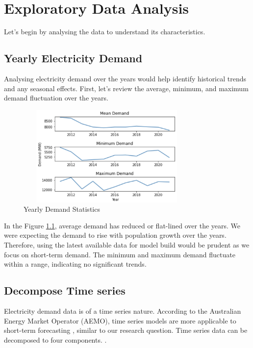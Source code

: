 \documentclass[mstat,12pt]{unswthesis}
\begin{document}
\hypertarget{exploratory-data-analysis}{%
\chapter{Exploratory Data Analysis}\label{exploratory-data-analysis}}

Let's begin by analysing the data to understand its characteristics.

\hypertarget{yearly-electricity-demand}{%
\section{Yearly Electricity Demand}\label{yearly-electricity-demand}}

Analysing electricity demand over the years would help identify
historical trends and any seasonal effects. First, let's review the
average, minimum, and maximum demand fluctuation over the years.

\begin{figure}[H]
\centering
\includegraphics[width=0.80\textwidth,height=5cm]{demand_stats.png}
\caption{Yearly Demand Statistics}
\label{demand_stats}
\end{figure}

In the Figure \ref{demand_stats}, average demand has reduced or
flat-lined over the years. We were expecting the demand to rise with
population growth over the years. Therefore, using the latest available
data for model build would be prudent as we focus on short-term demand.
The minimum and maximum demand fluctuate within a range, indicating no
significant trends.

\hypertarget{decompose-time-series}{%
\section{Decompose Time series}\label{decompose-time-series}}

Electricity demand data is of a time series nature. According to the
Australian Energy Market Operator (AEMO), time series models are more
applicable to short-term forecasting \cite{aemo2023forecasting}, similar
to our research question. Time series data can be decomposed to four
components. \cite{brownlee_2017_how}.
\end{document}
